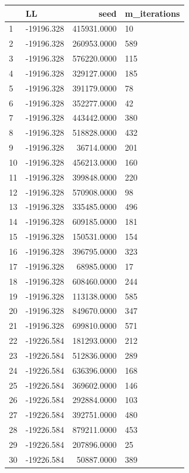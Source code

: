 \documentclass[]{book}
\theoremstyle{definition}
\theoremstyle{definition}
\theoremstyle{definition}
\theoremstyle{remark}
\begin{document}
\begin{tabular}{l|l|r|l}
\hline
  & LL & seed & m\_iterations\\
\hline
1 & -19196.328 & 415931.0000 & 10\\
\hline
2 & -19196.328 & 260953.0000 & 589\\
\hline
3 & -19196.328 & 576220.0000 & 115\\
\hline
4 & -19196.328 & 329127.0000 & 185\\
\hline
5 & -19196.328 & 391179.0000 & 78\\
\hline
6 & -19196.328 & 352277.0000 & 42\\
\hline
7 & -19196.328 & 443442.0000 & 380\\
\hline
8 & -19196.328 & 518828.0000 & 432\\
\hline
9 & -19196.328 & 36714.0000 & 201\\
\hline
10 & -19196.328 & 456213.0000 & 160\\
\hline
11 & -19196.328 & 399848.0000 & 220\\
\hline
12 & -19196.328 & 570908.0000 & 98\\
\hline
13 & -19196.328 & 335485.0000 & 496\\
\hline
14 & -19196.328 & 609185.0000 & 181\\
\hline
15 & -19196.328 & 150531.0000 & 154\\
\hline
16 & -19196.328 & 396795.0000 & 323\\
\hline
17 & -19196.328 & 68985.0000 & 17\\
\hline
18 & -19196.328 & 608460.0000 & 244\\
\hline
19 & -19196.328 & 113138.0000 & 585\\
\hline
20 & -19196.328 & 849670.0000 & 347\\
\hline
21 & -19196.328 & 699810.0000 & 571\\
\hline
22 & -19226.584 & 181293.0000 & 212\\
\hline
23 & -19226.584 & 512836.0000 & 289\\
\hline
24 & -19226.584 & 636396.0000 & 168\\
\hline
25 & -19226.584 & 369602.0000 & 146\\
\hline
26 & -19226.584 & 292884.0000 & 103\\
\hline
27 & -19226.584 & 392751.0000 & 480\\
\hline
28 & -19226.584 & 879211.0000 & 453\\
\hline
29 & -19226.584 & 207896.0000 & 25\\
\hline
30 & -19226.584 & 50887.0000 & 389\\

\end{tabular}
\end{document}
